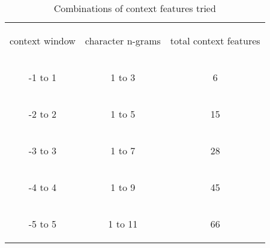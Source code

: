 \documentclass[runningheads,a4paper]{llncs}
\begin{document}
\begin{table}[H]
\caption{ Combinations of context features tried }
\centering
\begin{tabular}{ccc}\hline
\noalign{\smallskip}  \bf \begin{small} context window \end{small} & \bf \begin{small} character n-grams \end{small}& \bf \begin{small} total context features \end{small} \\ \noalign{\smallskip}   \hline
\noalign{\smallskip}  \begin{small} -1 to 1 \end{small}  & \begin{small} 1 to 3 \end{small} & \begin{small} 6  \end{small} \\\hline
\noalign{\smallskip}  \begin{small} -2 to 2 \end{small}  & \begin{small} 1 to 5 \end{small} & \begin{small} 15 \end{small} \\\hline
\noalign{\smallskip}  \begin{small} -3 to 3 \end{small}  & \begin{small} 1 to 7 \end{small} & \begin{small} 28 \end{small} \\\hline
\noalign{\smallskip}  \begin{small} -4 to 4 \end{small}  & \begin{small} 1 to 9 \end{small} & \begin{small} 45 \end{small} \\\hline
\noalign{\smallskip}  \begin{small} -5 to 5 \end{small}  & \begin{small} 1 to 11 \end{small} & \begin{small} 66 \end{small} \\\hline
  \end{tabular}
\label{table:combinations_of_context_features_tried}
\end{table}
\end{document}
